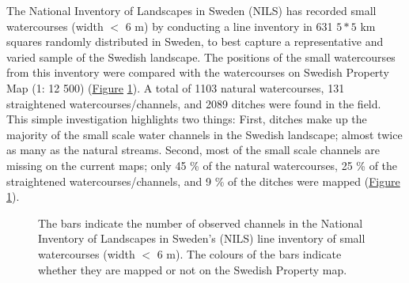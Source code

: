 \documentclass[11pt, review]{elsarticle} %
\begin{document}
The National Inventory of Landscapes in Sweden (NILS) has recorded small watercourses (width $<$ 6 m) by conducting a line inventory in 631 $5*5$ km squares randomly distributed in Sweden, to best capture a representative and varied sample of the Swedish landscape. The positions of the small watercourses from this inventory were compared with the watercourses on Swedish Property Map (1: 12 500) (\hyperref[fig:watercoursebarplot]{Figure} \ref{fig:watercoursebarplot}). A total of 1103 natural watercourses, 131 straightened watercourses/channels, and 2089 ditches were found in the field. This simple investigation highlights two things: First, ditches make up the majority of the small scale water channels in the Swedish landscape; almost twice as many as the natural streams. Second, most of the small scale channels are missing on the current maps; only 45 \% of the natural watercourses, 25 \% of the straightened watercourses/channels, and 9 \% of the ditches were mapped (\hyperref[fig:watercoursebarplot]{Figure} \ref{fig:watercoursebarplot}).

\begin{figure}[!htb]
    \centering
    \caption{The bars indicate the number of observed channels in the National Inventory of Landscapes in Sweden's (NILS) line inventory of small watercourses (width $<$ 6 m). The colours of the bars indicate whether they are mapped or not on the Swedish Property map.}
    \label{fig:watercoursebarplot}
\end{figure}
\end{document}
